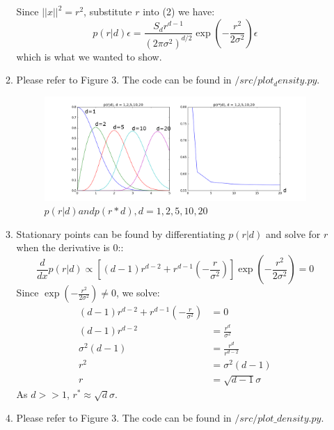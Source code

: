 \documentclass{article}
\begin{document}
\begin{enumerate}
\begin{enumerate}
\begin{equation}
        \end{equation}
        Since $||x||^2 = r^2$, substitute $r$ into (2) we have:
        \begin{equation}
            p(r|d)\epsilon = \frac{S_dr^{d-1}}{(2\pi\sigma^2)^{d/2}}\exp(-\frac{r^2}{2\sigma^2})\epsilon
        \end{equation}
        which is what we wanted to show.
    \item
        Please refer to Figure 3. The code can be found in $/src/plot_density.py$.
        \begin{figure}[h]
            \includegraphics[width=1\linewidth]{figure_3.png}
            \caption{$p(r|d) and p(r*d), d = 1,2,5,10,20$}
            \label{fig:graph3}
        \end{figure}
    \item
        Stationary points can be found by differentiating $p(r|d)$ and solve for $r$ when the derivative is 0::
        \begin{equation} \label{eq4}
            \frac{d}{dx}p(r|d) \propto[(d - 1)r^{d-2} + r^{d-1}(-\frac{r}{\sigma^2})]\exp(-\frac{r^2}{2\sigma^2}) = 0
        \end{equation}
        Since $\exp(-\frac{r^2}{2\sigma^2}) \neq 0$, we solve:
        \begin{equation}\label{eq5}
        \begin{split}
            (d - 1)r^{d-2} + r^{d-1}(-\frac{r}{\sigma^2}) &= 0\\
            (d - 1)r^{d-2} &= \frac{r^d}{\sigma^2}\\
            \sigma^2(d - 1) &= \frac{r^d}{r^{d-2}}\\
            r^2 &= \sigma^2(d - 1)\\
            r &= \sqrt{d-1}\sigma
        \end{split}
        \end{equation}
        As $d >> 1$, $r^* \approx \sqrt{d}\sigma$.
    \item
        Please refer to Figure 3. The code can be found in $/src/plot\_density.py$.

\end{enumerate}
\end{enumerate}
\end{document}
